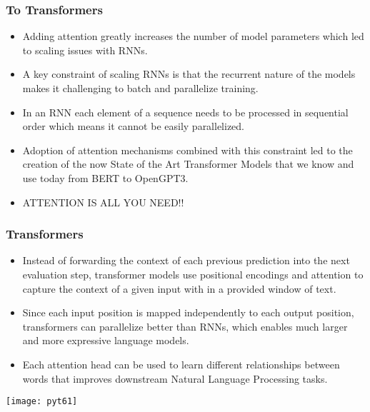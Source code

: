\begin{frame}[fragile] \frametitle{To Transformers}


\begin{itemize}
\item Adding attention greatly increases the number of model parameters which led to scaling issues with RNNs. 
\item A key constraint of scaling RNNs is that the recurrent nature of the models makes it challenging to batch and parallelize training. 
\item In an RNN each element of a sequence needs to be processed in sequential order which means it cannot be easily parallelized.
\item Adoption of attention mechanisms combined with this constraint led to the creation of the now State of the Art Transformer Models that we know and use today from BERT to OpenGPT3.
\item ATTENTION IS ALL YOU NEED!!
\end{itemize}
\end{frame}

\begin{frame}[fragile] \frametitle{Transformers}


\begin{itemize}
\item Instead of forwarding the context of each previous prediction into the next evaluation step, transformer models use positional encodings and attention to capture the context of a given input with in a provided window of text.
\item Since each input position is mapped independently to each output position, transformers can parallelize better than RNNs, which enables much larger and more expressive language models. 
\item Each attention head can be used to learn different relationships between words that improves downstream Natural Language Processing tasks.
\end{itemize}

\begin{center}
\texttt{[image: pyt61]}
\end{center}
\end{frame}

